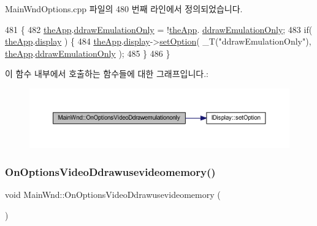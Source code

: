 Main\+Wnd\+Options.\+cpp 파일의 480 번째 라인에서 정의되었습니다.


\begin{DoxyCode}
481 \{
482     \mbox{\hyperlink{_v_b_a_8cpp_a8095a9d06b37a7efe3723f3218ad8fb3}{theApp}}.\mbox{\hyperlink{class_v_b_a_a18c0ee1eaa744d8061ce94ce6ed870fd}{ddrawEmulationOnly}} = !\mbox{\hyperlink{_v_b_a_8cpp_a8095a9d06b37a7efe3723f3218ad8fb3}{theApp}}.
      \mbox{\hyperlink{class_v_b_a_a18c0ee1eaa744d8061ce94ce6ed870fd}{ddrawEmulationOnly}};
483     \textcolor{keywordflow}{if}( \mbox{\hyperlink{_v_b_a_8cpp_a8095a9d06b37a7efe3723f3218ad8fb3}{theApp}}.\mbox{\hyperlink{class_v_b_a_a940e5bad8b3ed2436888dbcd03bfd563}{display}} ) \{
484         \mbox{\hyperlink{_v_b_a_8cpp_a8095a9d06b37a7efe3723f3218ad8fb3}{theApp}}.\mbox{\hyperlink{class_v_b_a_a940e5bad8b3ed2436888dbcd03bfd563}{display}}->\mbox{\hyperlink{class_i_display_a1766244708c252bb8781892c76c20ba9}{setOption}}( \_T(\textcolor{stringliteral}{"ddrawEmulationOnly"}), 
      \mbox{\hyperlink{_v_b_a_8cpp_a8095a9d06b37a7efe3723f3218ad8fb3}{theApp}}.\mbox{\hyperlink{class_v_b_a_a18c0ee1eaa744d8061ce94ce6ed870fd}{ddrawEmulationOnly}} );
485     \}
486 \}
\end{DoxyCode}
이 함수 내부에서 호출하는 함수들에 대한 그래프입니다.\+:
\nopagebreak
\begin{figure}[H]
\begin{center}
\leavevmode
\includegraphics[width=350pt]{class_main_wnd_a69c7fd2297cf789a4d25ffd6099776e6_cgraph}
\end{center}
\end{figure}
\mbox{\label{class_main_wnd_a1ba5ef62512a0cdef95369a411bb3c0d}} 
\subsubsection{\texorpdfstring{On\+Options\+Video\+Ddrawusevideomemory()}{OnOptionsVideoDdrawusevideomemory()}}
{\footnotesize\ttfamily void Main\+Wnd\+::\+On\+Options\+Video\+Ddrawusevideomemory (\begin{DoxyParamCaption}{ }\end{DoxyParamCaption})\hspace{0.3cm}{\ttfamily [protected]}}



